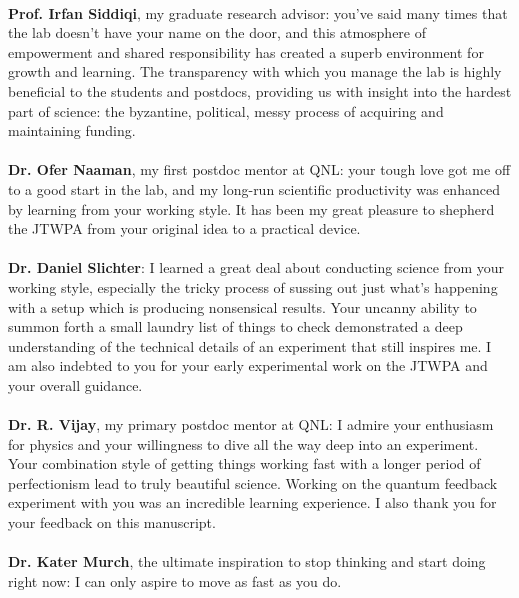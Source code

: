 \documentclass[12pt]{myucthesis}
\begin{document}
\begin{frontmatter}
\begin{acknowledgements}
\paragraph{}
\textbf{Prof. Irfan Siddiqi}, my graduate research advisor: you've said many times that the lab doesn't have your name on the door, and this atmosphere of empowerment and shared responsibility has created a superb environment for growth and learning.  The transparency with which you manage the lab is highly beneficial to the students and postdocs, providing us with insight into the hardest part of science: the byzantine, political, messy process of acquiring and maintaining funding.
\paragraph{}
\textbf{Dr. Ofer Naaman}, my first postdoc mentor at QNL: your tough love got me off to a good start in the lab, and my long-run scientific productivity was enhanced by learning from your working style.  It has been my great pleasure to shepherd the JTWPA from your original idea to a practical device.
\paragraph{}
\textbf{Dr. Daniel Slichter}: I learned a great deal about conducting science from your working style, especially the tricky process of sussing out just what's happening with a setup which is producing nonsensical results.  Your uncanny ability to summon forth a small laundry list of things to check demonstrated a deep understanding of the technical details of an experiment that still inspires me.  I am also indebted to you for your early experimental work on the JTWPA and your overall guidance.
\paragraph{}
\textbf{Dr. R. Vijay}, my primary postdoc mentor at QNL: I admire your enthusiasm for physics and your willingness to dive all the way deep into an experiment.  Your combination style of getting things working fast with a longer period of perfectionism lead to truly beautiful science.  Working on the quantum feedback experiment with you was an incredible learning experience.  I also thank you for your feedback on this manuscript.
\paragraph{}
\textbf{Dr. Kater Murch}, the ultimate inspiration to stop thinking and start doing right now: I can only aspire to move as fast as you do.

\end{acknowledgements}
\end{frontmatter}
\end{document}

